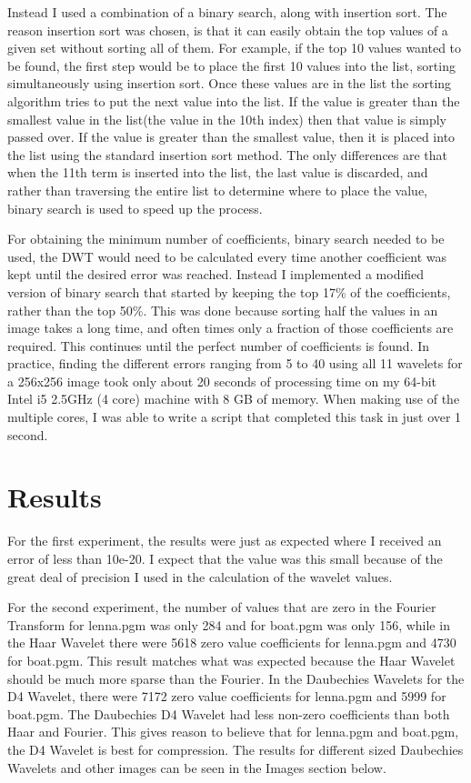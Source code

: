 Instead I used a combination of a binary search, along with insertion sort.  The reason insertion sort was chosen, is that it can easily obtain the top values of a given set without sorting all of them.  For example, if the top 10 values wanted to be found, the first step would be to place the first 10 values into the list, sorting simultaneously using insertion sort.  Once these values are in the list the sorting algorithm tries to put the next value into the list.  If the value is greater than the smallest value in the list(the value in the 10th index) then that value is simply passed over.  If the value is greater than the smallest value, then it is placed into the list using the standard insertion sort method.  The only differences are that when the 11th term is inserted into the list, the last value is discarded, and rather than traversing the entire list to determine where to place the value, binary search is used to speed up the process.

For obtaining the minimum number of coefficients, binary search needed to be used, the DWT would need to be calculated every time another coefficient was kept until the desired error was reached.  Instead I implemented a modified version of binary search that started by keeping the top 17\% of the coefficients, rather than the top 50\%.  This was done because sorting half the values in an image takes a long time, and often times only a fraction of those coefficients are required.  This continues until the perfect number of coefficients is found.  In practice, finding the different errors ranging from 5 to 40 using all 11 wavelets for a 256x256 image took only about 20 seconds of processing time on my 64-bit Intel i5 2.5GHz (4 core) machine with 8 GB of memory.  When making use of the multiple cores, I was able to write a script that completed this task in just over 1 second.

\section{Results}

For the first experiment, the results were just as expected where I received an error of less than 10e-20.  I expect that the value was this small because of the great deal of precision I used in the calculation of the wavelet values.

For the second experiment, the number of values that are zero in the Fourier Transform for lenna.pgm was only 284 and for boat.pgm was only 156, while in the Haar Wavelet there were 5618 zero value coefficients for lenna.pgm and 4730 for boat.pgm.  This result matches what was expected because the Haar Wavelet should be much more sparse than the Fourier.  In the Daubechies Wavelets for the D4 Wavelet, there were 7172 zero value coefficients for lenna.pgm and 5999 for boat.pgm.  The Daubechies D4 Wavelet had less non-zero coefficients than both Haar and Fourier.  This gives reason to believe that for lenna.pgm and boat.pgm, the D4 Wavelet is best for compression.  The results for different sized Daubechies Wavelets and other images can be seen in the Images section below.

